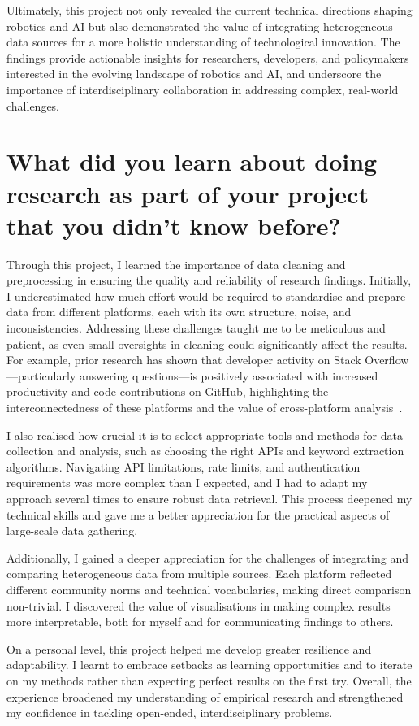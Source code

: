 \documentclass[sigconf, nonacm]{acmart}
\begin{document}
Ultimately, this project not only revealed the current technical directions shaping robotics and AI but also demonstrated the value of integrating heterogeneous data sources for a more holistic understanding of technological innovation. The findings provide actionable insights for researchers, developers, and policymakers interested in the evolving landscape of robotics and AI, and underscore the importance of interdisciplinary collaboration in addressing complex, real-world challenges.

\section{What did you learn about doing research as part of your project that you didn't know before?}
Through this project, I learned the importance of data cleaning and preprocessing in ensuring the quality and reliability of research findings. Initially, I underestimated how much effort would be required to standardise and prepare data from different platforms, each with its own structure, noise, and inconsistencies. Addressing these challenges taught me to be meticulous and patient, as even small oversights in cleaning could significantly affect the results. For example, prior research has shown that developer activity on Stack Overflow—particularly answering questions—is positively associated with increased productivity and code contributions on GitHub, highlighting the interconnectedness of these platforms and the value of cross-platform analysis~\cite{6693332}.

I also realised how crucial it is to select appropriate tools and methods for data collection and analysis, such as choosing the right APIs and keyword extraction algorithms. Navigating API limitations, rate limits, and authentication requirements was more complex than I expected, and I had to adapt my approach several times to ensure robust data retrieval. This process deepened my technical skills and gave me a better appreciation for the practical aspects of large-scale data gathering.

Additionally, I gained a deeper appreciation for the challenges of integrating and comparing heterogeneous data from multiple sources. Each platform reflected different community norms and technical vocabularies, making direct comparison non-trivial. I discovered the value of visualisations in making complex results more interpretable, both for myself and for communicating findings to others.

On a personal level, this project helped me develop greater resilience and adaptability. I learnt to embrace setbacks as learning opportunities and to iterate on my methods rather than expecting perfect results on the first try. Overall, the experience broadened my understanding of empirical research and strengthened my confidence in tackling open-ended, interdisciplinary problems.
\end{document}
